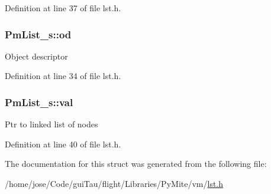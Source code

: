 Definition at line 37 of file lst.\-h.

\hypertarget{struct_pm_list__s_a79be70a215303b32283801c5f42dab17}{
\subsubsection[{od}]{ Pm\-List\-\_\-s\-::od}}\label{struct_pm_list__s_a79be70a215303b32283801c5f42dab17}
Object descriptor 

Definition at line 34 of file lst.\-h.

\hypertarget{struct_pm_list__s_af6395fc9b1e53c0e17435259662f86c3}{
\subsubsection[{val}]{ Pm\-List\-\_\-s\-::val}}\label{struct_pm_list__s_af6395fc9b1e53c0e17435259662f86c3}
Ptr to linked list of nodes 

Definition at line 40 of file lst.\-h.



The documentation for this struct was generated from the following file\-:\begin{DoxyCompactItemize}
\item 
/home/jose/\-Code/gui\-Tau/flight/\-Libraries/\-Py\-Mite/vm/\hyperlink{lst_8h}{lst.\-h}\end{DoxyCompactItemize}
